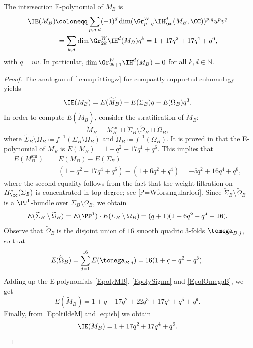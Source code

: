 \begin{prop}\label{prop:Epolynomial}
The intersection E-polynomial of $M_B$ is
\begin{align*}
\IE(M_B) & \coloneqq \sum_{p,q, d}(-1)^d \dim ( \Gr^W_{p+q} \IH^d_{\cc}(M_B, \CC))^{p,q} u^pv^q\\
& \hphantom{:}= \sum_{k, d} \dim \Gr^W_{2k}\IH^d(M_B) q^k = 1+17q^2+17q^4+q^6,
\end{align*}
with $q=uv$.
In particular,
$\dim \Gr^W_{2k+1}\IH^d(M_B)=0$ for all $k, d \in \mathbb{N}$.
\end{prop}
\begin{proof}

The analogue of \cref{lem:splittingw} for compactly supported cohomology yields
\begin{equation}\label{eq:ieb}
\IE(M_B)= E(\widetilde{M}_B)- E(\Sigma_B) q - E(\Omega_B) q^3.
\end{equation}
In order to compute $E(\widetilde{M}_B)$, consider the stratification of $\widetilde{M}_B$:
\[
\widetilde{M}_B= M_B^{\mathrm{sm}}\sqcup \widetilde{\Sigma}_B\setminus \widetilde{\Omega}_B\sqcup \widetilde{\Omega}_B,
\]
where $\widetilde{\Sigma}_B\setminus \widetilde{\Omega}_B \coloneqq f^{-1}({\Sigma}_B\setminus {\Omega}_B)$ and $\widetilde{\Omega}_B \coloneqq f^{-1}(\Omega_B)$.
It is proved in \cite[\S 8.2.3]{LogaresMunozNewstead2013} that the E-polynomial of $M_B$ is $E(M_B)=1+q^2+17q^4+q^6$.
This implies that
\begin{equation}
\begin{aligned}
E(M_B^{\mathrm{sm}})& = E(M_B) - E(\Sigma_B) \label{EpolyMB}\\
& = (1+q^2+17q^4+q^6) - (1+6q^2+q^4) =-5q^2+16q^4+q^6,
\end{aligned}
\end{equation}
where the second equality follows from the fact that the weight filtration on $H_{\cc}^*(\Sigma_B)$ is concentrated in top degree; see \cref{P=Wforsingularloci}.
Since $\widetilde{\Sigma}_B\setminus \widetilde{\Omega}_B$ is a
$\PP^1$-bundle over $\Sigma_B\setminus \Omega_B$, we obtain
\[
E(\widetilde{\Sigma}_B\setminus \widetilde{\Omega}_B) =E(\PP^1) \cdot E(\Sigma_B\setminus \Omega_B) =(q+1) (1 + 6q^2+q^4 -16). \label{EpolySigma}
\]
Observe that $\widetilde{\Omega}_B$ is the disjoint union of $16$ smooth quadric $3$-folds $\tomega_{B,j}$, so that
\begin{equation}\label{EpolOmegaB}
E(\widetilde{\Omega}_B)=\sum_{j=1}^{16} E(\tomega_{B,j})= 16(1+q+q^2+q^3).
\end{equation}
Adding up the E-polynomials \eqref{EpolyMB}, \eqref{EpolySigma} and \eqref{EpolOmegaB}, we get
\begin{equation}\label{EpoltildeM}
E(\widetilde{M}_B)=1+q+17q^2+22q^3+17q^4+q^5+q^6.
\end{equation}
Finally, from \eqref{EpoltildeM} and \eqref{eq:ieb} we obtain
\begin{equation}\label{IEM_B}
\IE(M_B)=1+17q^2+17q^4+q^6.
\end{equation}


\end{proof}

